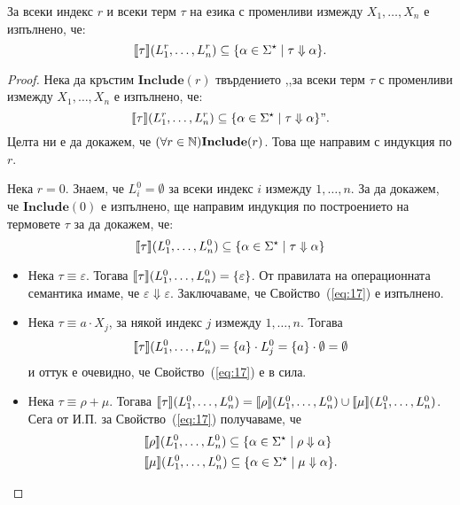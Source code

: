 \begin{lemma}
  За всеки индекс $r$ и всеки терм $\tau$ на езика \REG с променливи измежду $X_1,\dots,X_n$ е изпълнено, че:
  \[\llbracket{\tau}\rrbracket(L^r_1,\dots,L^r_n) \subseteq \{\alpha \in \Sigma^\star \mid \tau \Downarrow \alpha\}.\]
\end{lemma}
\begin{proof}
  Нека да кръстим $\textbf{Include}(r)$ твърдението
  ,,за всеки терм $\tau$ с променливи измежду $X_1,\dots,X_n$ е изпълнено, че:
  \[\llbracket{\tau}\rrbracket(L^r_1,\dots,L^r_n) \subseteq \{\alpha \in \Sigma^\star \mid \tau \Downarrow \alpha\}".\]
  Целта ни е да докажем, че $(\forall r\in\mathbb{N})\textbf{Include}(r)$. Това ще направим с индукция по $r$.
  
  Нека $r = 0$. Знаем, че $L^0_i = \emptyset$ за всеки индекс $i$ измежду $1,\dots,n$.
  За да докажем, че $\textbf{Include}(0)$ е изпълнено, ще направим индукция по построението на термовете $\tau$ за да докажем, че:
  \begin{equation}
    \label{eq:17}
    \llbracket{\tau}\rrbracket(L^0_1,\dots,L^0_n) \subseteq \{\alpha \in \Sigma^\star \mid \tau \Downarrow \alpha\}
  \end{equation}
  \begin{itemize}
  \item
    Нека $\tau \equiv \varepsilon$. Тогава $\llbracket{\tau}\rrbracket(L^0_1,\dots,L^0_n) = \{\varepsilon\}$.
    От правилата на операционната семантика имаме, че $\varepsilon \Downarrow \varepsilon$.
    Заключаваме, че Свойство~(\ref{eq:17}) е изпълнено.
  \item
    Нека $\tau \equiv a \cdot X_j$, за някой индекс $j$ измежду $1,\dots,n$. Тогава
    \[\llbracket{\tau}\rrbracket(L^0_1,\dots,L^0_n) = \{a\}\cdot L^0_j = \{a\} \cdot \emptyset = \emptyset\]
    и оттук е очевидно, че Свойство~(\ref{eq:17}) е в сила.
  \item
    Нека $\tau \equiv \rho + \mu$. Тогава $\llbracket{\tau}\rrbracket(L^0_1,\dots,L^0_n) = \llbracket{\rho}\rrbracket(L^0_1,\dots,L^0_n) \cup \llbracket{\mu}\rrbracket(L^0_1,\dots,L^0_n)$. Сега от И.П. за Свойство~(\ref{eq:17}) получаваме, че
    \begin{align*}
      & \val{\rho}(L^0_1,\dots,L^0_n) \subseteq \{\alpha \in \Sigma^\star \mid \rho \Downarrow \alpha\}\\
      & \val{\mu}(L^0_1,\dots,L^0_n) \subseteq \{\alpha \in \Sigma^\star \mid \mu \Downarrow \alpha\}.

\end{align*}
\end{itemize}
\end{proof}
